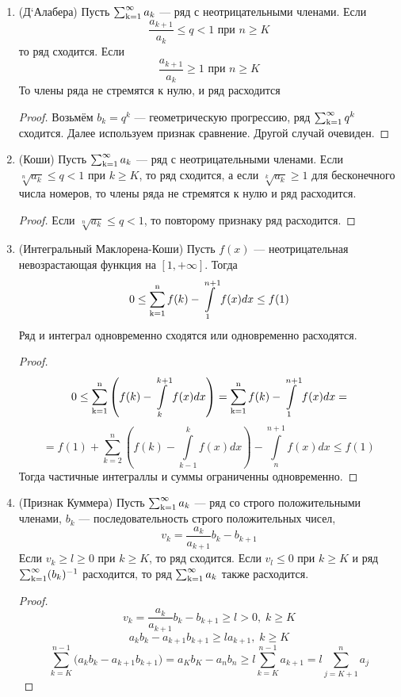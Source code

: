 \begin{enumerate}
\begin{proof}
$$ \prod_{k+K}^{n-1}\frac{a_{k+1}}{a_k} \le \prod_{k+K}^{n-1}\frac{b_{k+1}}{b_k}\text{, т.е. } \frac{a_{n}}{a_K} \le \frac{b_{n}}{b_K}, n>K$$
Значит, $a_n \le \frac{a_K}{b_K}b_n, n>K$, поэтому из сходимости ряда $\ssum b_k$ следует сходимость ряда $\ssum a_k$
\end{proof}
\item
(Д`Алабера) Пусть $\ssum a_k$ --- ряд с неотрицательными членами. Если
$$\frac{a_{k+1}}{a_k} \le q < 1 \text{ при } n\ge K$$
то ряд сходится. Если
$$ \frac{a_{k+1}}{a_k} \ge 1 \text{ при } n \ge K$$
То члены ряда не стремятся к нулю, и ряд расходится
\begin{proof}
Возьмём $b_k = q^k$ --- геометрическую прогрессию, ряд $\operatorname{\sum_{k=1}^{\infty}} q^k$ сходится.
Далее используем признак сравнение. Другой случай очевиден.
\end{proof}
\item
(Коши) Пусть $\ssum a_k$ --- ряд с неотрицательными членами. Если $ \sqrt[n]{a_k}\le q < 1$ при $k \ge K $,
то ряд сходится, а если $ \sqrt[k]{a_k}\ge 1$ для бесконечного числа номеров, то члены ряда не стремятся к нулю и ряд расходится.
\begin{proof}
Если  $\sqrt[n]{a_k}\le q < 1$, то повторому признаку ряд расходится. 
\end{proof}
\item
(Интегральный Маклорена-Коши) Пусть $f(x)$ --- неотрицательная невозрастающая функция на $ [1,+\infty] $. Тогда
$$ 0 \le \operatorname{\sum_{k=1}^{n}} f(k) - \int\limits_1^{n+1}f(x)dx\le f(1)$$
Ряд и интеграл одновременно сходятся или одновременно расходятся.
\begin{proof}
$$ 0\le \operatorname{\sum_{k=1}^{n}} \left( f(k) - \int\limits_k^{k+1}f(x)dx \right) = \operatorname{\sum_{k=1}^{n}} f(k) - \int\limits_1^{n+1}f(x)dx = $$
$$ = f(1)+\sum_{k=2}^n \left( f(k) - \int\limits_{k-1}^k f(x)dx \right) - \int\limits_n^{n+1} f(x)dx \le f(1)$$
Тогда частичные интеграллы и суммы ограниченны одновременно.
\end{proof}
\item
(Признак Куммера) Пусть $\ssum a_k$ --- ряд со строго положительными членами,
$b_k$ --- последовательность строго положительных чисел,
$$ v_k = \frac{a_k}{a_{k+1}}b_k - b_{k+1}$$
Если $v_k \ge l \ge 0$ при $k \ge K$, то ряд сходится. Если $v_l \le 0$ при $k \ge K$ и ряд $\operatorname{\sum_{k=1}^{\infty}} (b_k)^{-1}$ расходится, то ряд $\ssum a_k$ также расходится.
\begin{proof}
$$v_k = \frac{a_k}{a_{k+1}} b_k - b_{k+1} \ge l	> 0,\; k \ge K$$
$$a_k b_k-a_{k+1}b_{k+1} \ge l a_{k+1},\; k\ge K$$
$$\sum_{k=K}^{n-1} \big( a_k b_k-a_{k+1}b_{k+1} \big) = a_Kb_K - a_nb_n \ge l \sum_{k=K}^{n-1} a_{k+1} = l \sum_{j=K+1}^{n}a_{j}$$

\end{proof}
\end{enumerate}
